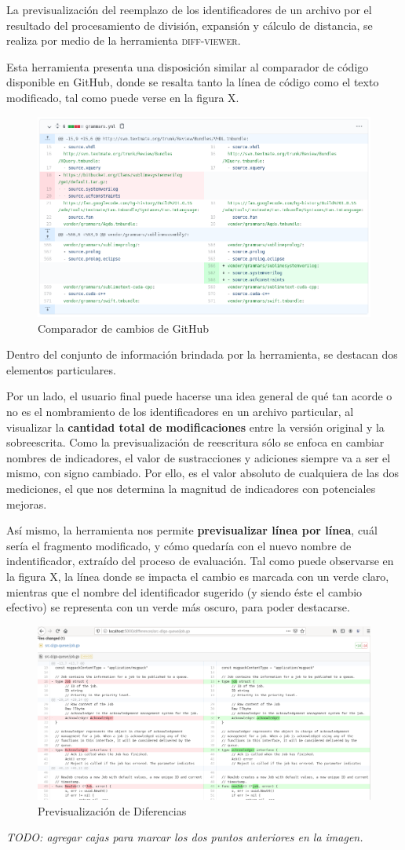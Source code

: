 La previsualización del reemplazo de los identificadores de un archivo
por el resultado del procesamiento de división, expansión y cálculo de distancia,
se realiza por medio de la herramienta \textsc{diff-viewer}.

Esta herramienta presenta una disposición similar al comparador de código
disponible en GitHub, donde se resalta tanto la línea de código como el texto modificado,
tal como puede verse en la figura X.

\begin{figure}[H]
  \includegraphics[width=12cm]{implementation/github_comparator.png}
  \centering
  \caption{Comparador de cambios de GitHub}
\end{figure}

Dentro del conjunto de información brindada por la herramienta, se destacan
dos elementos particulares.

Por un lado, el usuario final puede hacerse una idea general de qué tan acorde
o no es el nombramiento de los identificadores en un archivo particular, al
visualizar la \textbf{cantidad total de modificaciones} entre la versión original
y la sobreescrita.
Como la previsualización de reescritura sólo se enfoca en cambiar nombres de
indicadores, el valor de sustracciones y adiciones siempre va a ser el mismo, con
signo cambiado.
Por ello, es el valor absoluto de cualquiera de las dos mediciones, el que nos
determina la magnitud de indicadores con potenciales mejoras.

Así mismo, la herramienta nos permite \textbf{previsualizar línea por línea}, cuál sería
el fragmento modificado, y cómo quedaría con el nuevo nombre de indentificador,
extraído del proceso de evaluación.
Tal como puede observarse en la figura X, la línea donde se impacta el cambio
es marcada con un verde claro, mientras que el nombre del identificador sugerido
(y siendo éste el cambio efectivo) se representa con un verde más oscuro, para
poder destacarse.

\begin{figure}[H]
  \includegraphics[width=12cm]{implementation/diff_viewer.png}
  \centering
  \caption{Previsualización de Diferencias}
\end{figure}

\textit{TODO: agregar cajas para marcar los dos puntos anteriores en la imagen.}
